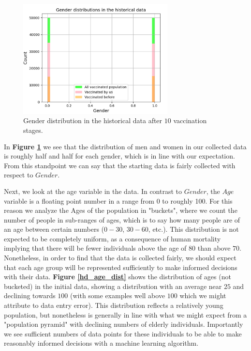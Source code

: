 \documentclass{article}
\begin{document}
\begin{figure}[H]
    \centering
    \includegraphics[height=6cm]{hd_gender_dist_version2.png}
    \caption{Gender distribution in the historical data after $10$ vaccination stages.}
    \label{hd_gender_dist}
\end{figure}


In \textbf{Figure \ref{hd_gender_dist}} we see that the distribution of men and women in our collected data is roughly half and half for each gender, which is in line with our expectation. From this standpoint we can say that the starting data is fairly collected with respect to $Gender$.

Next, we look at the age variable in the data. In contrast to $Gender$, the $Age$ variable is a floating point number in a range from 0 to roughly 100. For this reason we analyze the Ages of the population in "buckets", where we count the number of people in sub-ranges of ages, which is to say how many people are of an age between certain numbers ($0-30$, $30-60$, etc.). This distribution is not expected to be completely uniform, as a consequence of human mortality implying  that there will be fewer individuals above the age of $80$ than above $70$. Nonetheless, in order to find that the data is collected fairly, we should expect that each age group will be represented sufficiently to make informed decisions with their data. \textbf{Figure \ref{hd_age_dist}} shows the distribution of ages (not bucketed) in the initial data, showing a distribution with an average near $25$ and declining towards $100$ (with some examples well above $100$ which we might attribute to data entry error). This distribution reflects a relatively young population, but nonetheless is generally in line with what we might expect from a "population pyramid" with declining numbers of elderly individuals. Importantly we see sufficient numbers of data points for these individuals to be able to make reasonably informed decisions with a machine learning algorithm.
\end{document}
